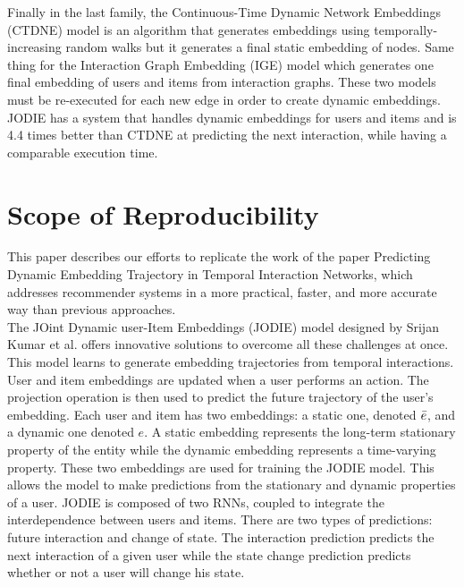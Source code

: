 Finally in the last family, the Continuous-Time Dynamic Network Embeddings\supercite{CTDNE} (CTDNE) model is an algorithm that generates embeddings using temporally-increasing random walks but it generates a final static embedding of nodes. Same thing for the Interaction Graph Embedding\supercite{IGE} (IGE) model which generates one final embedding of users and items from interaction graphs. These two models must be re-executed for each new edge in order to create dynamic embeddings. JODIE has a system that handles dynamic embeddings for users and items and is 4.4 times better than CTDNE at predicting the next interaction, while having a comparable execution time.


\section*{Scope of Reproducibility}

This paper describes our efforts to replicate the work of the paper Predicting Dynamic Embedding Trajectory in Temporal Interaction Networks\supercite{kumar2019predicting}, which addresses recommender systems in a more practical, faster, and more accurate way than previous approaches.\\

The JOint Dynamic user-Item Embeddings (JODIE) model designed by Srijan Kumar et al.\supercite{kumar2019predicting} offers innovative solutions to overcome all these challenges at once. This model learns to generate embedding trajectories from temporal interactions. User and item embeddings are updated when a user performs an action. The projection operation is then used to predict the future trajectory of the user's embedding. Each user and item has two embeddings: a static one, denoted $\Bar{e}$, and a dynamic one denoted $e$. A static embedding represents the long-term stationary property of the entity while the dynamic embedding represents a time-varying property. These two embeddings are used for training the JODIE model. This allows the model to make predictions from the stationary and dynamic properties of a user. JODIE is composed of two RNNs, coupled to integrate the interdependence between users and items. There are two types of predictions: future interaction and change of state. The interaction prediction predicts the next interaction of a given user while the state change prediction predicts whether or not a user will change his state.\\

